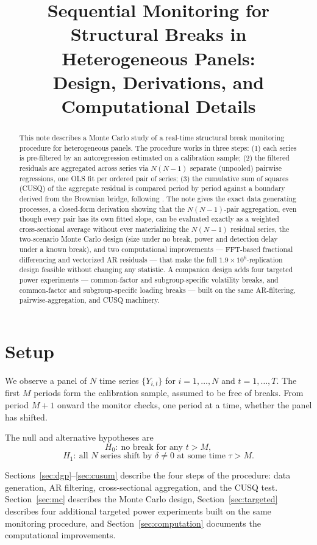 \documentclass[12pt]{article}
\title{Sequential Monitoring for Structural Breaks in Heterogeneous Panels:\\
Design, Derivations, and Computational Details}
\author{}
\date{}
\begin{document}
\maketitle

\begin{abstract}
\noindent
This note describes a Monte Carlo study of a real-time structural break
monitoring procedure for heterogeneous panels. The procedure works in three
steps: (1) each series is pre-filtered by an autoregression estimated on a
calibration sample; (2) the filtered residuals are aggregated across series
via $N(N-1)$ separate (unpooled) pairwise regressions, one OLS fit per
ordered pair of series; (3) the cumulative sum of squares (CUSQ) of
the aggregate residual is compared period by period against a boundary
derived from the Brownian bridge, following \citet{WangHsiao2013}. The note
gives the exact data generating processes, a closed-form derivation showing
that the $N(N-1)$-pair aggregation, even though every pair has its own
fitted slope, can be evaluated exactly as a weighted cross-sectional average
without ever materializing the $N(N-1)$ residual series, the two-scenario
Monte Carlo design (size under no break, power and
detection delay under a known break), and two computational improvements
--- FFT-based fractional differencing and vectorized AR residuals --- that
make the full $1.9\times10^6$-replication design feasible without changing
any statistic. A companion design adds four targeted power experiments ---
common-factor and subgroup-specific volatility breaks, and common-factor
and subgroup-specific loading breaks --- built on the same AR-filtering,
pairwise-aggregation, and CUSQ machinery.
\end{abstract}

\section{Setup}
\label{sec:setup}

We observe a panel of $N$ time series $\{Y_{i,t}\}$ for $i=1,\dots,N$ and
$t=1,\dots,T$. The first $M$ periods form the calibration sample, assumed to
be free of breaks. From period $M+1$ onward the monitor checks, one period at
a time, whether the panel has shifted.

The null and alternative hypotheses are
\[
H_0:\ \text{no break for any } t > M,
\]
\[
H_1:\ \text{all } N \text{ series shift by } \delta \neq 0
      \text{ at some time } \tau > M.
\]

Sections~\ref{sec:dgp}--\ref{sec:cusum} describe the four steps of the
procedure: data generation, AR filtering, cross-sectional aggregation, and
the CUSQ test. Section~\ref{sec:mc} describes the Monte Carlo design,
Section~\ref{sec:targeted} describes four additional targeted power
experiments built on the same monitoring procedure, and
Section~\ref{sec:computation} documents the computational improvements.
\end{document}
